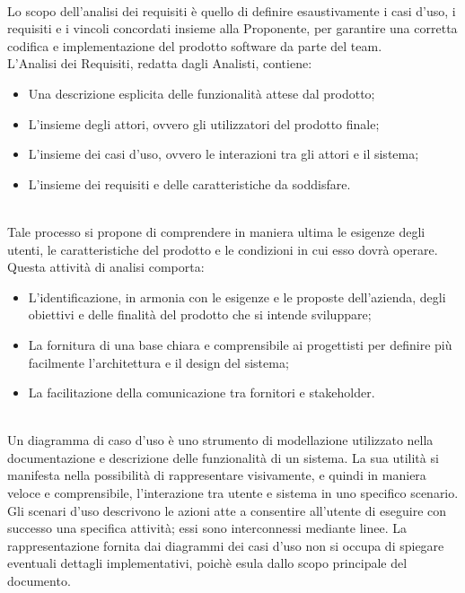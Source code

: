 \\
Lo scopo dell'analisi dei requisiti è quello di definire esaustivamente i casi d'uso, i requisiti e i vincoli concordati insieme alla Proponente, per garantire una corretta codifica e implementazione del prodotto software da parte del team.\\
L'Analisi dei Requisiti, redatta dagli Analisti, contiene:
\begin{itemize}
    \item Una descrizione esplicita delle funzionalità attese dal prodotto;
    \item L'insieme degli attori, ovvero gli utilizzatori del prodotto finale;
    \item L'insieme dei casi d'uso, ovvero le interazioni tra gli attori e il sistema;
    \item L'insieme dei requisiti e delle caratteristiche da soddisfare.
\end{itemize}
\\
Tale processo si propone di comprendere in maniera ultima le esigenze degli utenti, le caratteristiche del prodotto e le condizioni in cui esso dovrà operare.\\
Questa attività di analisi comporta:
\begin{itemize}
    \item L'identificazione, in armonia con le esigenze e le proposte dell'azienda, degli obiettivi e delle finalità del prodotto che si intende sviluppare;
    \item La fornitura di una base chiara e comprensibile ai progettisti per definire più facilmente l'architettura e il design del sistema;
    \item La facilitazione della comunicazione tra fornitori e stakeholder.
\end{itemize}
\\
Un diagramma di caso d'uso è uno strumento di modellazione utilizzato nella documentazione e descrizione delle funzionalità di un sistema. La sua utilità si manifesta nella possibilità di rappresentare visivamente, e quindi in maniera veloce e comprensibile, l'interazione tra utente e sistema in uno specifico scenario. Gli scenari d'uso descrivono le azioni atte a consentire all'utente di eseguire con successo una specifica attività; essi sono interconnessi mediante linee. La rappresentazione fornita dai diagrammi dei casi d'uso non si occupa di spiegare eventuali dettagli implementativi, poichè esula dallo scopo principale del documento.\\
